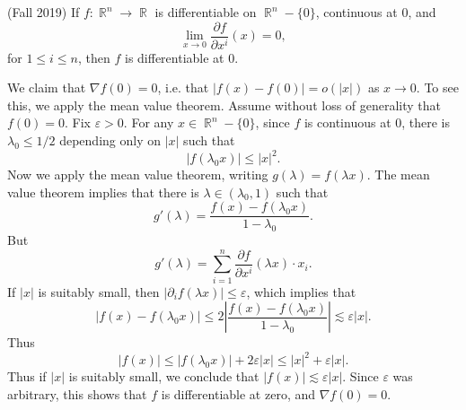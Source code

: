 \documentclass[answers]{exam}
\DeclareMathOperator{\RR}{\mathbb{R}}
\begin{document}
\begin{questions}
\question (Fall 2019) If $f: \RR^n \to \RR$ is differentiable on $\RR^n - \{ 0 \}$, continuous at 0, and
%
\[ \lim_{x \to 0} \frac{\partial f}{\partial x^i}(x) = 0, \]
%
for $1 \leq i \leq n$, then $f$ is differentiable at 0.
\begin{solution}
	We claim that $\nabla f(0) = 0$, i.e. that $|f(x) - f(0)| = o(|x|)$ as $x \to 0$. To see this, we apply the mean value theorem. Assume without loss of generality that $f(0) = 0$. Fix $\varepsilon > 0$. For any $x \in \RR^n - \{ 0 \}$, since $f$ is continuous at $0$, there is $\lambda_0 \leq 1/2$ depending only on $|x|$ such that
	\[ |f(\lambda_0 x)| \leq |x|^2. \]
	Now we apply the mean value theorem, writing $g(\lambda) = f(\lambda x)$. The mean value theorem implies that there is $\lambda \in (\lambda_0, 1)$ such that
	\[ g'(\lambda) = \frac{f(x) - f(\lambda_0 x)}{1 - \lambda_0}. \]
	But
	\[ g'(\lambda) = \sum_{i = 1}^n \frac{\partial f}{\partial x^i}(\lambda x) \cdot x_i. \]
	If $|x|$ is suitably small, then $|\partial_i f(\lambda x)| \leq \varepsilon$, which implies that
	\[ |f(x) - f(\lambda_0 x)| \leq 2 \left| \frac{f(x) - f(\lambda_0 x)}{1 - \lambda_0} \right| \lesssim \varepsilon |x|. \]
	Thus
	\[ |f(x)| \leq |f(\lambda_0 x)| + 2 \varepsilon |x| \leq |x|^2 + \varepsilon |x|. \]
	Thus if $|x|$ is suitably small, we conclude that $|f(x)| \lesssim \varepsilon |x|$. Since $\varepsilon$ was arbitrary, this shows that $f$ is differentiable at zero, and $\nabla f(0) = 0$.
\end{solution}





\end{questions}
\end{document}
